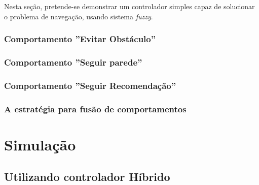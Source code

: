 	Nesta seção, pretende-se demonstrar um controlador simples capaz de solucionar 
	o problema de navegação, usando sistema \textit{fuzzy}.
	
	\subsubsection{Comportamento ''Evitar Obstáculo''}
	
	
	
	
	
	
	
	
	
	\subsubsection{Comportamento ''Seguir parede''}

	
	
	

	
	
	\subsubsection{Comportamento ''Seguir Recomendação''}
	
	
	
	
	
	
	
	
	
	\subsubsection{A estratégia para fusão de comportamentos}
	
\section{Simulação}

	\subsection{Utilizando controlador Híbrido}
	
